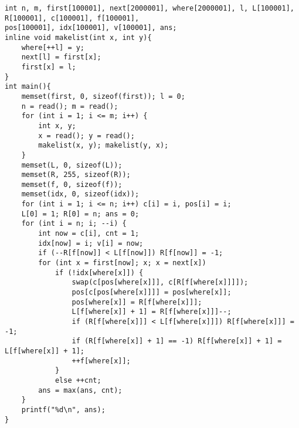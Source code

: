 \begin{lstlisting}
int n, m, first[100001], next[2000001], where[2000001], l, L[100001], R[100001], c[100001], f[100001],
pos[100001], idx[100001], v[100001], ans;
inline void makelist(int x, int y){
    where[++l] = y;
    next[l] = first[x];
    first[x] = l;
}
int main(){
    memset(first, 0, sizeof(first)); l = 0;
    n = read(); m = read();
    for (int i = 1; i <= m; i++) {
        int x, y;
        x = read(); y = read();
        makelist(x, y); makelist(y, x);
    }
    memset(L, 0, sizeof(L));
    memset(R, 255, sizeof(R));
    memset(f, 0, sizeof(f));
    memset(idx, 0, sizeof(idx));
    for (int i = 1; i <= n; i++) c[i] = i, pos[i] = i;
    L[0] = 1; R[0] = n; ans = 0;
    for (int i = n; i; --i) {
        int now = c[i], cnt = 1;
        idx[now] = i; v[i] = now;
        if (--R[f[now]] < L[f[now]]) R[f[now]] = -1;
        for (int x = first[now]; x; x = next[x])
            if (!idx[where[x]]) {
                swap(c[pos[where[x]]], c[R[f[where[x]]]]);
                pos[c[pos[where[x]]]] = pos[where[x]];
                pos[where[x]] = R[f[where[x]]];
                L[f[where[x]] + 1] = R[f[where[x]]]--;
                if (R[f[where[x]]] < L[f[where[x]]]) R[f[where[x]]] = -1;
                if (R[f[where[x]] + 1] == -1) R[f[where[x]] + 1] = L[f[where[x]] + 1];
                ++f[where[x]];
            }
            else ++cnt;
        ans = max(ans, cnt);
    }
    printf("%d\n", ans);
}
\end{lstlisting}

